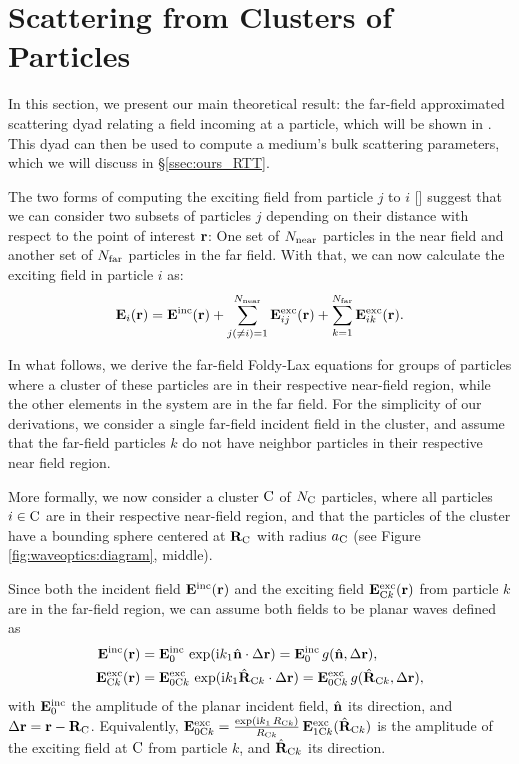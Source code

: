 \section{Scattering from Clusters of Particles}
\label{sec:waveoptics:ours_theory}

In this section, we present our main theoretical result: the far-field approximated scattering dyad relating a field incoming at a particle, which will be shown in .
This dyad can then be used to compute a medium's bulk scattering parameters, which we will discuss in \S\ref{ssec:ours_RTT}.

The two forms of computing the exciting field from particle $j$ to $i$ [] suggest that we can consider two subsets of particles $j$ depending on their distance with respect to the point of interest $\mathbf{r}$: One set of $N_\mathrm{near}$ particles in the near field and another set of $N_\mathrm{far}$ particles in the far field. With that, we can now calculate the exciting field in particle $i$ as:
\begin{equation}
    \mathbf{E}_{i}(\mathbf{r}) = \mathbf{E}^\mathrm{inc}(\mathbf{r}) + \sum_{j(\neq i)=1}^{N_\mathrm{near}} \mathbf{E}^\mathrm{exc}_{ij}(\mathbf{r}) + \sum_{k=1}^{N_\mathrm{far}} \mathbf{E}^\mathrm{exc}_{ik}(\mathbf{r}).
    \label{eq:foldylaxtwo}
\end{equation}

In what follows, we derive the far-field Foldy-Lax equations for groups of particles where a cluster of these particles are in their respective near-field region, while the other elements in the system are in the far field. For the simplicity of our derivations, we consider a single far-field incident field in the cluster, and assume that the far-field particles $k$ do not have neighbor particles in their respective near field region.

More formally, we now consider a cluster $\mathrm{C}$ of $N_{\mathrm{C}}$ particles, where all particles $i\in\mathrm{C}$ are in their respective near-field region, and that the particles of the cluster have a bounding sphere centered at $\mathbf{R}_{\mathrm{C}}$ with radius $a_{\mathrm{C}}$ (see Figure \ref{fig:waveoptics:diagram}, middle). 

Since both the incident field $\mathbf{E}^\mathrm{inc}(\mathbf{r})$ and the exciting field $\mathbf{E}^\mathrm{exc}_{\mathrm{C} k}(\mathbf{r})$ from particle $k$ are in the far-field region, we can assume both fields to be planar waves defined as
\begin{align}
    \label{eq:farincfieldcluster}
    \mathbf{E}^\mathrm{inc}(\mathbf{r}) &= \mathbf{E}^\mathrm{inc}_0 \,\exp(\mathrm{i} k_1 \hat{\mathbf{n}} \cdot \Delta \mathbf{r}) = \mathbf{E}^\mathrm{inc}_0\,g(\hat{\mathbf{n}}, \Delta \mathbf{r}) , \\
    \mathbf{E}^\mathrm{exc}_{\mathrm{C} k}(\mathbf{r}) &= \mathbf{E}^\mathrm{exc}_{0\mathrm{C} k}\,\exp(\mathrm{i} k_1 \hat{\mathbf{R}}_{\mathrm{C} k} \cdot \Delta \mathbf{r}) =  \mathbf{E}^\mathrm{exc}_{0\mathrm{C} k}\,g(\hat{\mathbf{R}}_{\mathrm{C} k}, \Delta \mathbf{r}), 
    \label{eq:farexcfieldcluster} 
\end{align}
with $\mathbf{E}^\mathrm{inc}_0$ the amplitude of the planar incident field, $\hat{\mathbf{n}}$ its direction, and $\Delta \mathbf{r}=\mathbf{r}-\mathbf{R}_{\mathrm{C}}$. Equivalently, $\mathbf{E}^\mathrm{exc}_{0\mathrm{C} k}=\frac{\exp(\mathrm{i} k_1 \,R_{\mathrm{C} k})}{R_{\mathrm{C} k}}\,\mathbf{E}^\mathrm{exc}_{1\mathrm{C} k}(\hat{\mathbf{R}}_{\mathrm{C} k})$  is the amplitude of the exciting field at $\mathrm{C}$ from particle $k$, and $\hat{\mathbf{R}}_{\mathrm{C} k}$ its direction. 

